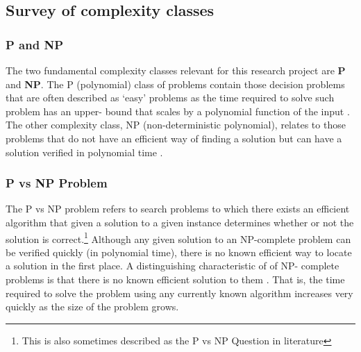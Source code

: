 \documentclass[11pt, a4paper, oneside]{report} %
\begin{document}
\subsection{Survey of complexity classes}

\subsubsection{P and NP}

The two fundamental complexity classes relevant for this research project are \textbf{P} and
\textbf{NP}\@. The P (polynomial) class of problems contain those decision problems that are often
described as `easy' problems \cite{kendall2008survey} as the time required to solve such problem has
an upper- bound that scales by a polynomial function of the input \cite{sipser2012introduction}. The
other complexity class, NP (non-deterministic polynomial), relates to those problems that do not
have an efficient way of finding a solution but can have a solution verified in polynomial time
\cite{Goldreich:2008, Papadimitriou:2003:CC:1074100.1074233}.





\subsubsection{P vs NP Problem}

The P vs NP problem refers to search problems to which there exists an efficient
algorithm that given a solution to a given instance determines whether or not
the solution is correct\cite{sipser2012introduction,Goldreich:2008,kendall2008su
rvey,du2011theory}.\footnote{This is also sometimes described as the P vs NP
Question in literature} Although any given solution to an NP-complete problem
can be verified quickly (in polynomial time), there is no known efficient way to
locate a solution in the first place. A distinguishing characteristic of of NP-
complete problems is that there is no known efficient solution to them
\cite{Goldreich:2008}. That is, the time required to solve the problem using any
currently known algorithm increases very quickly as the size of the problem
grows.
\end{document}
